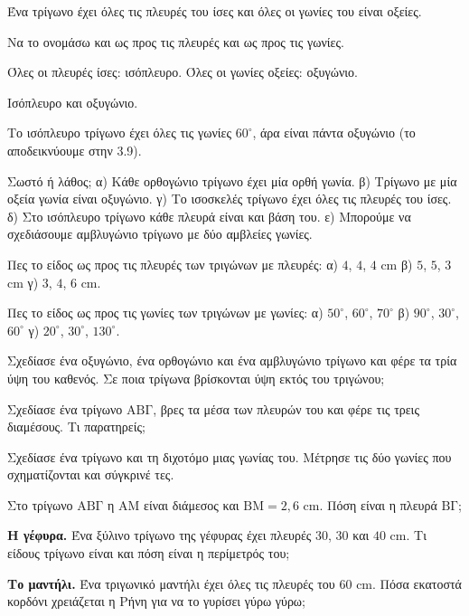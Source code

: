 \tixero Ένα τρίγωνο έχει όλες τις πλευρές του ίσες και όλες οι γωνίες του είναι οξείες.\par
\tithelo Να το ονομάσω και ως προς τις πλευρές και ως προς τις γωνίες.\par
\possindeo Όλες οι πλευρές ίσες: ισόπλευρο. Όλες οι γωνίες οξείες: οξυγώνιο.\par
\apantisi Ισόπλευρο και οξυγώνιο.\par
\elegxos Το ισόπλευρο τρίγωνο έχει όλες τις γωνίες $60^\circ$, άρα είναι πάντα οξυγώνιο (το αποδεικνύουμε στην 3.9).



\ex Σωστό ή λάθος; α) Κάθε ορθογώνιο τρίγωνο έχει μία ορθή γωνία. \quad β) Τρίγωνο με μία οξεία γωνία είναι οξυγώνιο. \quad γ) Το ισοσκελές τρίγωνο έχει όλες τις πλευρές του ίσες. \quad δ) Στο ισόπλευρο τρίγωνο κάθε πλευρά είναι και βάση του. \quad ε) Μπορούμε να σχεδιάσουμε αμβλυγώνιο τρίγωνο με δύο αμβλείες γωνίες.

\ex Πες το είδος ως προς τις πλευρές των τριγώνων με πλευρές: α) $4$, $4$, $4$ cm \quad β) $5$, $5$, $3$ cm \quad γ) $3$, $4$, $6$ cm.

\ex Πες το είδος ως προς τις γωνίες των τριγώνων με γωνίες: α) $50^\circ$, $60^\circ$, $70^\circ$ \quad β) $90^\circ$, $30^\circ$, $60^\circ$ \quad γ) $20^\circ$, $30^\circ$, $130^\circ$.

\ex Σχεδίασε ένα οξυγώνιο, ένα ορθογώνιο και ένα αμβλυγώνιο τρίγωνο και φέρε τα τρία ύψη του καθενός. Σε ποια τρίγωνα βρίσκονται ύψη εκτός του τριγώνου;

\ex Σχεδίασε ένα τρίγωνο $\mathrm{ΑΒΓ}$, βρες τα μέσα των πλευρών του και φέρε τις τρεις διαμέσους. Τι παρατηρείς;

\ex Σχεδίασε ένα τρίγωνο και τη διχοτόμο μιας γωνίας του. Μέτρησε τις δύο γωνίες που σχηματίζονται και σύγκρινέ τες.

\ex Στο τρίγωνο $\mathrm{ΑΒΓ}$ η $\mathrm{ΑΜ}$ είναι διάμεσος και $\mathrm{ΒΜ}=2{,}6$ cm. Πόση είναι η πλευρά $\mathrm{ΒΓ}$;


\ex \textbf{Η γέφυρα.} Ένα ξύλινο τρίγωνο της γέφυρας έχει πλευρές $30$, $30$ και $40$ cm. Τι είδους τρίγωνο είναι και πόση είναι η περίμετρός του;

\ex \textbf{Το μαντήλι.} Ένα τριγωνικό μαντήλι έχει όλες τις πλευρές του $60$ cm. Πόσα εκατοστά κορδόνι χρειάζεται η Ρήνη για να το γυρίσει γύρω γύρω;

